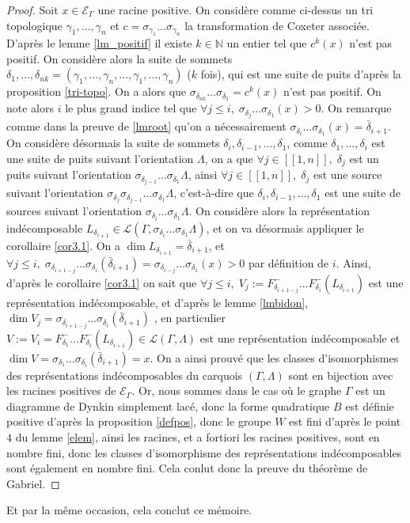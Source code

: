 \documentclass[a4paper,11pt]{article}
\newcommand{\EG}{\mathscr{E}_\Gamma}
\newcommand{\ent}[2]{[\![#1,#2]\!]}
\begin{document}
\begin{proof}
	Soit $x\in\EG$ une racine positive. On considère comme ci-dessus un tri	topologique $\gamma_1,\dots,\gamma_n$ et $c=\sigma_{\gamma_1}\dots\sigma_{\gamma_n}$ la transformation de Coxeter associée. D'après le lemme \ref{lm_positif} il existe $k\in\mathbb N$ un entier tel que $c^k(x)$ n'est pas positif. On considère alors la suite de sommets $\delta_1,\dots,\delta_{nk}=(\gamma_1,\dots,\gamma_n,\dots,\gamma_1,\dots,\gamma_n)$	($k$ fois), qui est une suite de puits d'après la proposition \ref{tri-topo}. On a alors que $\sigma_{\delta_{nk}}\dots\sigma_{\delta_1}=c^k(x)$ n'est pas positif. On note alors $i$ le plus grand indice tel que $\forall j\leq i,\; \sigma_{\delta_{j}}\dots\sigma_{\delta_1}(x)>0$. On remarque comme dans la preuve de \ref{lmroot} qu'on a nécessairement $\sigma_{\delta_{i}}\dots\sigma_{\delta_1}(x)=\bar\delta_{i+1}$. On considère désormais la suite de sommets $\delta_i,\delta_{i-1},\dots,\delta_1$, comme $\delta_1,\dots,\delta_{i}$ est une suite de puits suivant l'orientation $\Lambda$, on a que $\forall j\in\ent{1}{n},\;\delta_{j}$ est un puits suivant l'orientation $\sigma_{\delta_{j-1}}\dots\sigma_{\delta_1}\Lambda$, ainsi $\forall j\in\ent{1}{n},\;\delta_{j}$ est une source suivant l'orientation $\sigma_{\delta_j}\sigma_{\delta_{j-1}}\dots\sigma_{\delta_1}\Lambda$, c'est-à-dire que $\delta_i,\delta_{i-1},\dots,\delta_1$ est une suite de sources suivant l'orientation $\sigma_{\delta_{i}}\dots\sigma_{\delta_1}\Lambda$. On considère alors la représentation indécomposable $L_{\delta_{i+1}}\in\mathscr L(\Gamma,\sigma_{\delta_{i}}\dots\sigma_{\delta_1}\Lambda)$, et on va désormais appliquer le corollaire \ref{cor3.1}. On a $\dim L_{\delta_{i+1}}=\bar\delta_{i+1}$, et $\forall j\leq i,\;\sigma_{\delta_{i+1-j}}\dots\sigma_{\delta_i}(\bar\delta_{i+1})=\sigma_{\delta_{i-j}}\dots\sigma_{\delta_{1}}(x)>0$ par définition de $i$. Ainsi, d'après le corollaire \ref{cor3.1} on sait que $\forall j\leq i,\;V_{j}:=F_{\delta_{i+1-j}}^-\dots F_{\delta_i}^-(L_{\delta_{i+1}})$ est une représentation indécomposable, et d'après le lemme \ref{lmbidon}, $\dim V_{j}=\sigma_{\delta_{i+1-j}}\dots\sigma_{\delta_i}(\bar\delta_{i+1})$ , en particulier $V:=V_i=F_{\delta_1}^-\dots F_{\delta_i}^-(L_{\delta_{i+1}})\in\mathscr L(\Gamma,\Lambda)$ est une représentation indécomposable et $\dim V=\sigma_{\delta_1}\dots\sigma_{\delta_i}(\bar\delta_{i+1})=x$. On a ainsi prouvé que les classes d'isomorphismes des représentations indécomposables du carquois $(\Gamma,\Lambda)$ sont en bijection avec les racines positives de $\EG$. Or, nous sommes dans le cas où le graphe $\Gamma$ est un diagramme de Dynkin simplement lacé, donc la forme quadratique $B$ est définie positive d'après la proposition \ref{defpos}, donc le groupe $W$ est fini d'après le point $4$ du lemme \ref{elem}, ainsi les racines, et a fortiori les racines positives, sont en nombre fini, donc les classes d'isomorphisme des représentations indécomposables sont également en nombre fini. Cela conlut donc la preuve du théorème de Gabriel.


\end{proof}
Et par la même occasion, cela conclut ce mémoire.
\clearpage


\end{document}

